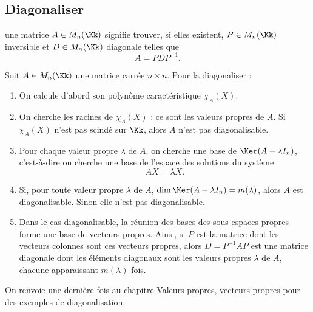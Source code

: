 \documentclass[12pt, class=report,crop=false]{standalone}
\begin{document}
\subsection{Diagonaliser}

 une matrice $A \in M_n(\Kk)$ signifie trouver, 
si elles existent, $P \in M_n(\Kk)$ inversible et $D \in M_n(\Kk)$ diagonale telles que
\[A = PDP^{-1} .\]

\bigskip

Soit $A \in M_n(\Kk)$ une matrice carrée $n \times n$. 
Pour la diagonaliser :
\begin{enumerate}
  \item On calcule d'abord son polynôme caractéristique $\chi_A(X)$.

  \item On cherche les racines de $\chi_A(X)$ : ce sont les valeurs propres de $A$.
  Si $\chi_A(X)$ n'est pas scindé sur $\Kk$, alors $A$ n'est pas diagonalisable.
  
  \item Pour chaque valeur propre $\lambda$ de $A$, on cherche une base de $\Ker(A-\lambda I_n)$, 
  c'est-à-dire on cherche une base de l'espace des solutions du système
\[AX = \lambda X.\]

  \item Si, pour toute valeur propre $\lambda$ de $A$, $\dim \Ker (A -\lambda I_n) = m(\lambda)$, alors 
  $A$ est diagonalisable. Sinon elle n'est pas diagonalisable.
  
  \item Dans le cas diagonalisable, la réunion des bases des sous-espaces propres 
  forme une base de vecteurs propres. Ainsi, si $P$ est la matrice dont les vecteurs 
  colonnes sont ces vecteurs propres, alors $D=P^{-1}AP$ est une matrice diagonale dont les éléments diagonaux sont les valeurs propres $\lambda$ de $A$, chacune apparaissant $m(\lambda)$ fois. 
 \end{enumerate} 


On renvoie une dernière fois au chapitre \og{}Valeurs propres, vecteurs propres\fg{} pour des exemples de diagonalisation.
\end{document}
